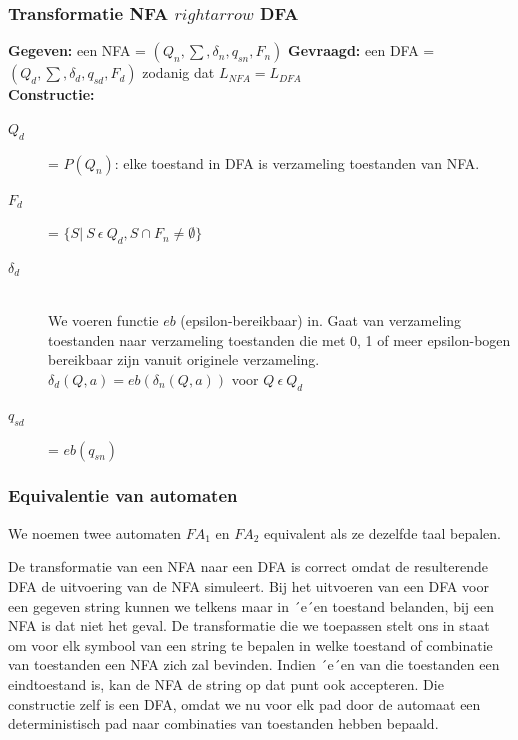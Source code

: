 \documentclass{article}
\begin{document}
            \subsubsection{Transformatie NFA $rightarrow$ DFA}
                \textbf{Gegeven:} een NFA = $(Q_n,\sum, \delta_n,q_{sn}, F_n)$
                \textbf{Gevraagd:} een DFA = $(Q_d,\sum, \delta_d,q_{sd}, F_d)$ zodanig dat $L_{NFA}=L_{DFA}$ \\
                \textbf{Constructie:}
                \begin{description}
                    \item[$Q_d$] = $P(Q_n)$: elke toestand in DFA is verzameling toestanden van NFA.
                    \item[$F_d$] = $\{S \vert\  S\ \epsilon\ Q_d, S \cap F_n \neq \emptyset \}$
                    \item[$\delta_d$] \hfill \\
                        We voeren functie $eb$ (epsilon-bereikbaar) in. Gaat van verzameling toestanden naar verzameling toestanden die met 0, 1 of meer epsilon-bogen bereikbaar zijn vanuit originele verzameling.\\
                        
                        $\delta_d(Q, a) = eb(\delta_n(Q, a))$ voor $Q\ \epsilon\ Q_d$
                    \item[$q_{sd}$] = $eb(q_{sn})$
                \end{description}
            \subsubsection{Equivalentie van automaten}
                We noemen twee automaten $FA_1$ en $FA_2$ equivalent als ze dezelfde taal bepalen.

                De transformatie van een NFA naar een DFA is correct omdat de resulterende DFA de uitvoering van de NFA simuleert. Bij het uitvoeren van een DFA voor een gegeven string kunnen we telkens maar in ´e´en toestand belanden, bij een NFA is dat niet het geval. De transformatie die we toepassen stelt ons in staat om voor elk symbool van een string te bepalen in welke toestand of combinatie van toestanden een NFA zich zal bevinden. Indien ´e´en van die toestanden een eindtoestand is, kan de NFA de string op dat punt ook accepteren. Die constructie zelf is een DFA, omdat we nu voor elk pad door de automaat een deterministisch pad naar combinaties van toestanden hebben bepaald.
\end{document}
